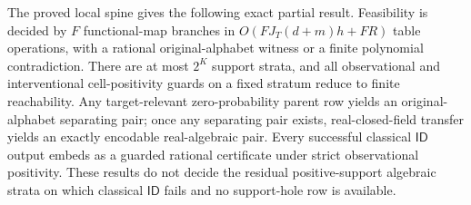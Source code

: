 The proved local spine gives the following exact partial result.  Feasibility is decided by \(F\) functional-map branches in \(O(FJ_T(d+m)h+FR)\) table operations, with a rational original-alphabet witness or a finite polynomial contradiction.  There are at most \(2^K\) support strata, and all observational and interventional cell-positivity guards on a fixed stratum reduce to finite reachability.  Any target-relevant zero-probability parent row yields an original-alphabet separating pair; once any separating pair exists, real-closed-field transfer yields an exactly encodable real-algebraic pair.  Every successful classical \(\mathsf{ID}\) output embeds as a guarded rational certificate under strict observational positivity.  These results do not decide the residual positive-support algebraic strata on which classical \(\mathsf{ID}\) fails and no support-hole row is available.